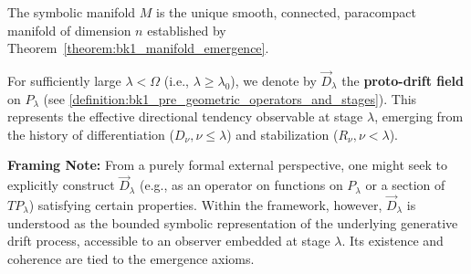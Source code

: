 \begin{definition}
\label{definition:bk1_symbolic_manifold_existence}
The symbolic manifold $M$ is the unique smooth, connected, paracompact manifold of dimension $n$ established by Theorem~\ref{theorem:bk1_manifold_emergence}.
\end{definition}

\begin{definition}
\label{definition:bk1_proto_drift_field}
For sufficiently large $\lambda < \Omega$ (i.e., $\lambda \ge \lambda_0$), we denote by $\vec{D}_\lambda$ the \textbf{proto-drift field} on $P_\lambda$ (see \ref{definition:bk1_pre_geometric_operators_and_stages}). This represents the effective directional tendency observable at stage $\lambda$, emerging from the history of differentiation ($D_\nu, \nu \le \lambda$) and stabilization ($R_\nu, \nu < \lambda$).

\smallskip
\noindent
\textbf{Framing Note:} From a purely formal external perspective, one might seek to explicitly construct $\vec{D}_\lambda$ (e.g., as an operator on functions on $P_\lambda$ or a section of $TP_\lambda$) satisfying certain properties. Within the framework, however, $\vec{D}_\lambda$ is understood as the bounded symbolic representation of the underlying generative drift process, accessible to an observer embedded at stage $\lambda$. Its existence and coherence are tied to the emergence axioms.
\end{definition}

